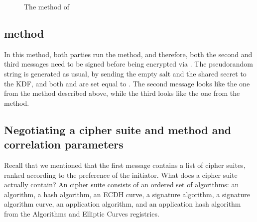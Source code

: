 {\begin{figure}[!h]
{}
\caption{The \mStatSig{} method of \mEdhoc}
\label{fig:edhocstatsig}
\end{figure}

\subsection{\mSigSig{} method}
In this method, both parties run the \mSig{} method, and therefore, both the second and third messages need to be signed before being encrypted via \mAead. The pseudorandom string \mPRKtwo is generated as usual, by sending the empty salt and the shared secret to the KDF, and both \mPRKthree and \mPRKfour are set equal to \mPRKtwo. The second message looks like the one from the \mSigStat{} method described above, while the third looks like the one from the \mStatSig{} method.

\subsection{Negotiating a cipher suite and method and correlation parameters}
\label{sec:ciphersuite}
Recall that we mentioned that the first message contains a list of cipher suites, ranked according to the preference of the initiator. What does a cipher suite actually contain? An \mEdhoc{} cipher suite consists of an ordered set of \mCose{} algorithms: an \mAead{} algorithm, a hash algorithm, an ECDH curve, a signature algorithm, a signature algorithm curve, an application \mAead{} algorithm, and an application hash algorithm from the \mCose{} Algorithms and Elliptic Curves registries.  

}
